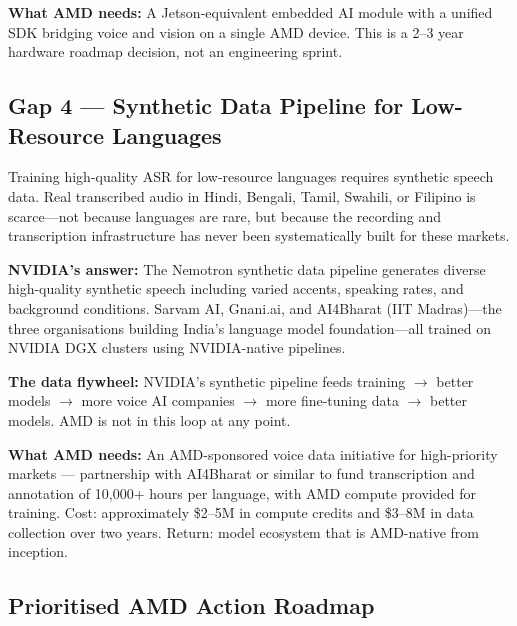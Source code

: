 \documentclass[12pt,a4paper]{article}
\begin{document}
\textbf{What AMD needs:} A Jetson-equivalent embedded AI module with a
unified SDK bridging voice and vision on a single AMD device.  This is a
2--3 year hardware roadmap decision, not an engineering sprint.

\subsection{Gap 4 --- Synthetic Data Pipeline for Low-Resource Languages}

Training high-quality ASR for low-resource languages requires synthetic
speech data.  Real transcribed audio in Hindi, Bengali, Tamil, Swahili, or
Filipino is scarce---not because languages are rare, but because the
recording and transcription infrastructure has never been systematically
built for these markets.

\textbf{NVIDIA's answer:} The Nemotron synthetic data pipeline generates
diverse high-quality synthetic speech including varied accents, speaking
rates, and background conditions.  Sarvam AI, Gnani.ai, and AI4Bharat (IIT
Madras)---the three organisations building India's language model
foundation---all trained on NVIDIA DGX clusters using NVIDIA-native pipelines.

\textbf{The data flywheel:} NVIDIA's synthetic pipeline feeds training
$\to$ better models $\to$ more voice AI companies $\to$ more fine-tuning
data $\to$ better models.  AMD is not in this loop at any point.

\textbf{What AMD needs:} An AMD-sponsored voice data initiative for
high-priority markets --- partnership with AI4Bharat or similar to fund
transcription and annotation of 10{,}000+ hours per language, with AMD
compute provided for training.  Cost: approximately \$2--5M in compute
credits and \$3--8M in data collection over two years.  Return: model
ecosystem that is AMD-native from inception.

\subsection{Prioritised AMD Action Roadmap}
\end{document}
